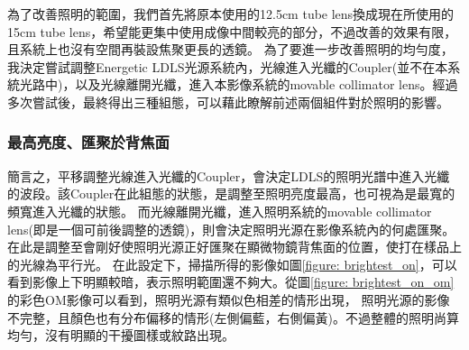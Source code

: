 \documentclass[12pt]{article}
\begin{document}
為了改善照明的範圍，我們首先將原本使用的12.5cm tube lens換成現在所使用的15cm tube lens，希望能更集中使用成像中間較亮的部分，不過改善的效果有限，且系統上也沒有空間再裝設焦聚更長的透鏡。
為了要進一步改善照明的均勻度，我決定嘗試調整Energetic LDLS光源系統內，光線進入光纖的Coupler(並不在本系統光路中)，以及光線離開光纖，進入本影像系統的movable collimator lens。經過多次嘗試後，最終得出三種組態，可以藉此瞭解前述兩個組件對於照明的影響。
\subsubsection{最高亮度、匯聚於背焦面} \label{section: illuOriginal}
簡言之，平移調整光線進入光纖的Coupler，會決定LDLS的照明光譜中進入光纖的波段。該Coupler在此組態的狀態，是調整至照明亮度最高，也可視為是最寬的頻寬進入光纖的狀態。
而光線離開光纖，進入照明系統的movable collimator lens(即是一個可前後調整的透鏡)，則會決定照明光源在影像系統內的何處匯聚。在此是調整至會剛好使照明光源正好匯聚在顯微物鏡背焦面的位置，使打在樣品上的光線為平行光。
在此設定下，掃描所得的影像如圖\ref{figure: brightest_on}，可以看到影像上下明顯較暗，表示照明範圍還不夠大。從圖\ref{figure: brightest_on_om}的彩色OM影像可以看到，照明光源有類似色相差的情形出現，
照明光源的影像不完整，且顏色也有分布偏移的情形(左側偏藍，右側偏黃)。不過整體的照明尚算均勻，沒有明顯的干擾圖樣或紋路出現。
\end{document}
